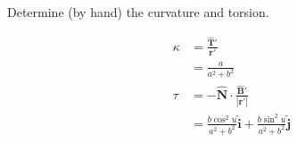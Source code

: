 Determine (by hand) the curvature and torsion.

\begin{solution}
\begin{align*}
    \kappa &= \frac{\boldsymbol{\hat{T}'}}{\boldsymbol{r'}} \\
    &= \frac{a}{a^2+b^2} \\
    \tau &= -\boldsymbol{\hat{N}} \cdot \frac{\boldsymbol{\hat{B}'}}{|\boldsymbol{r'}|} \\
    &= \frac{b\cos^2 u}{a^2+b^2}\hat{\boldsymbol{i}} + \frac{b\sin^2 u}{a^2+b^2}\hat{\boldsymbol{j}}
\end{align*}
\end{solution}